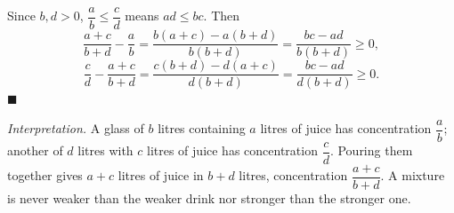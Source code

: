 Since $b,d>0$, $\dfrac ab\le\dfrac cd$ means $ad\le bc$. Then
\[\dfrac{a+c}{b+d}-\dfrac ab=\dfrac{b(a+c)-a(b+d)}{b(b+d)}=\dfrac{bc-ad}{b(b+d)}\ge0,\]
\[\dfrac cd-\dfrac{a+c}{b+d}=\dfrac{c(b+d)-d(a+c)}{d(b+d)}=\dfrac{bc-ad}{d(b+d)}\ge0.\]
$\blacksquare$

\emph{Interpretation.} A glass of $b$ litres containing $a$ litres of juice has concentration $\dfrac ab$; another of $d$ litres with $c$ litres of juice has concentration $\dfrac cd$. Pouring them together gives $a+c$ litres of juice in $b+d$ litres, concentration $\dfrac{a+c}{b+d}$. A mixture is never weaker than the weaker drink nor stronger than the stronger one.
